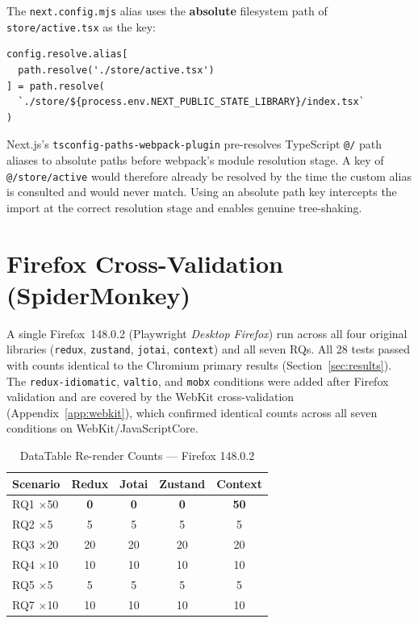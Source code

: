 \documentclass[conference]{IEEEtran}
\newcommand{\code}[1]{\texttt{\small #1}}
\begin{document}
The \code{next.config.mjs} alias uses the \textbf{absolute} filesystem
path of \code{store/active.tsx} as the key:

\begin{lstlisting}
config.resolve.alias[
  path.resolve('./store/active.tsx')
] = path.resolve(
  `./store/${process.env.NEXT_PUBLIC_STATE_LIBRARY}/index.tsx`
)
\end{lstlisting}

Next.js's \code{tsconfig-paths-webpack-plugin} pre-resolves TypeScript
\code{@/} path aliases to absolute paths before webpack's module
resolution stage. A key of \code{@/store/active} would therefore already
be resolved by the time the custom alias is consulted and would never
match. Using an absolute path key intercepts the import at the correct
resolution stage and enables genuine tree-shaking.

\section{Firefox Cross-Validation (SpiderMonkey)}
\label{app:firefox}

A single Firefox~148.0.2 (Playwright \textit{Desktop Firefox}) run
across all four original libraries (\code{redux}, \code{zustand},
\code{jotai}, \code{context}) and all seven RQs. All 28 tests passed with
counts identical to the Chromium primary results
(Section~\ref{sec:results}). The \code{redux-idiomatic}, \code{valtio},
and \code{mobx} conditions were added after Firefox validation and are
covered by the WebKit cross-validation (Appendix~\ref{app:webkit}),
which confirmed identical counts across all seven conditions on
WebKit/JavaScriptCore.

\begin{table}[t]
\caption{DataTable Re-render Counts --- Firefox 148.0.2}
\label{tab:ff-datatable}
\begin{center}
\scriptsize
\setlength{\tabcolsep}{4pt}
\begin{tabular}{lcccc}
\toprule
\textbf{Scenario} & \textbf{Redux} & \textbf{Jotai} & \textbf{Zustand} & \textbf{Context} \\
\midrule
RQ1 $\times$50 & \textbf{0} & \textbf{0} & \textbf{0} & \textbf{50} \\
RQ2 $\times$5  & 5  & 5  & 5  & 5  \\
RQ3 $\times$20 & 20 & 20 & 20 & 20 \\
RQ4 $\times$10 & 10 & 10 & 10 & 10 \\
RQ5 $\times$5  & 5  & 5  & 5  & 5  \\
RQ7 $\times$10 & 10 & 10 & 10 & 10 \\
\bottomrule
\end{tabular}
\end{center}
\end{table}
\end{document}
